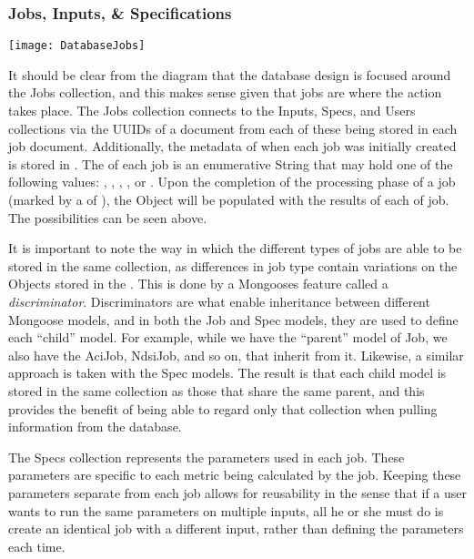 \subsubsection{Jobs, Inputs, \& Specifications}
\begin{center}
  \texttt{[image: DatabaseJobs]} \\[12pt]
\end{center}
It should be clear from the diagram that the database design is focused around the Jobs collection, and this makes sense given that jobs are where the action takes place. The Jobs collection connects to the Inputs, Specs, and Users collections via the UUID\textquotesingle s of a document from each of these being stored in each job document. Additionally, the metadata of when each job was initially created is stored in . The  of each job is an enumerative String that may hold one of the following values: , , , , or . Upon the completion of the processing phase of a job (marked by a  of ), the  Object will be populated with the results of each  of job. The possibilities can be seen above.\par
It is important to note the way in which the different types of jobs are able to be stored in the same collection, as differences in job type contain variations on the Objects stored in the . This is done by a Mongoose\textquotesingle s feature called a \textit{discriminator}. Discriminators are what enable inheritance between different Mongoose models, and in both the Job and Spec models, they are used to define each ``child'' model. For example, while we have the ``parent'' model of Job, we also have the AciJob, NdsiJob, and so on, that inherit from it. Likewise, a similar approach is taken with the Spec models. The result is that each child model is stored in the same collection as those that share the same parent, and this provides the benefit of being able to regard only that collection when pulling information from the database.\par
The Specs collection represents the parameters used in each job. These parameters are specific to each metric being calculated by the job. Keeping these parameters separate from each job allows for reusability in the sense that if a user wants to run the same parameters on multiple inputs, all he or she must do is create an identical job with a different input, rather than defining the parameters each time.

